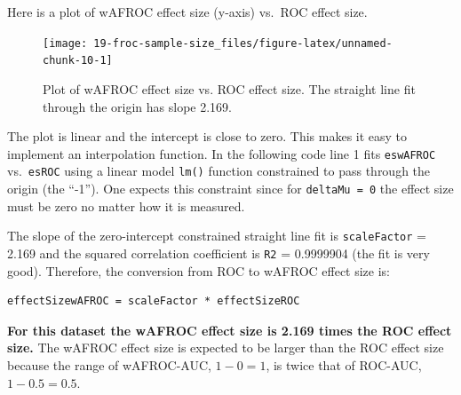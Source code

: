 \documentclass[
]{book}
\newenvironment{Shaded}{\begin{snugshade}}{\end{snugshade}}
\newcommand{\CommentTok}[1]{\textcolor[rgb]{0.56,0.35,0.01}{\textit{#1}}}
\newcommand{\DecValTok}[1]{\textcolor[rgb]{0.00,0.00,0.81}{#1}}
\newcommand{\FloatTok}[1]{\textcolor[rgb]{0.00,0.00,0.81}{#1}}
\newcommand{\FunctionTok}[1]{\textcolor[rgb]{0.00,0.00,0.00}{#1}}
\newcommand{\NormalTok}[1]{#1}
\newcommand{\OtherTok}[1]{\textcolor[rgb]{0.56,0.35,0.01}{#1}}
\newcommand{\SpecialCharTok}[1]{\textcolor[rgb]{0.00,0.00,0.00}{#1}}
\begin{document}
Here is a plot of wAFROC effect size (y-axis) vs.~ROC effect size.

\begin{figure}

{\centering \texttt{[image: 19-froc-sample-size\_files/figure-latex/unnamed-chunk-10-1]} 

}

\caption{Plot of wAFROC effect size vs. ROC effect size. The straight line fit through the origin has slope 2.169.}\label{fig:unnamed-chunk-10}
\end{figure}

The plot is linear and the intercept is close to zero. This makes it easy to implement an interpolation function. In the following code line 1 fits \texttt{eswAFROC} vs.~\texttt{esROC} using a linear model \texttt{lm()} function constrained to pass through the origin (the ``-1''). One expects this constraint since for \texttt{deltaMu\ =\ 0} the effect size must be zero no matter how it is measured.

\begin{Shaded}
\end{Shaded}

The slope of the zero-intercept constrained straight line fit is \texttt{scaleFactor} = 2.169 and the squared correlation coefficient is \texttt{R2} = 0.9999904 (the fit is very good). Therefore, the conversion from ROC to wAFROC effect size is:

\begin{verbatim}
effectSizewAFROC = scaleFactor * effectSizeROC
\end{verbatim}

\textbf{For this dataset the wAFROC effect size is 2.169 times the ROC effect size.} The wAFROC effect size is expected to be larger than the ROC effect size because the range of wAFROC-AUC, \(1-0=1\), is twice that of ROC-AUC, \(1-0.5=0.5\).
\end{document}
